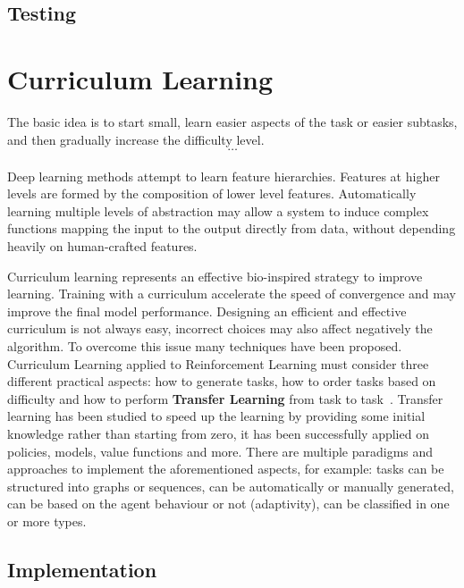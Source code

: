 \documentclass[11pt, a4paper, hidelinks]{report}
\begin{document}
\subsection{Testing}\label{subsec:testing2}

\section{Curriculum Learning}\label{sec:curriculum-learning}

\begin{quoting}[font=itshape, begintext={"}, endtext={"\citep{bengio_curiculum}}]
The basic idea is to start small, learn easier aspects of the task or easier subtasks, and then gradually increase the difficulty level.\\
\[\dots\]\\
Deep learning methods attempt to learn feature hierarchies.
Features at higher levels are formed by the composition of lower level features.
Automatically learning multiple levels of abstraction may allow a system to induce complex functions mapping the input to the output directly from data, without depending heavily on human-crafted features.
\end{quoting}

Curriculum learning represents an effective bio-inspired strategy to improve learning.
Training with a curriculum accelerate the speed of convergence and may improve the final model performance.
Designing an efficient and effective curriculum is not always easy, incorrect choices may also affect negatively the algorithm.
To overcome this issue many techniques have been proposed.
Curriculum Learning applied to Reinforcement Learning must consider three different practical aspects: how to generate tasks, how to order tasks based on difficulty and how to perform \textbf{Transfer Learning} from task to task~\citep{narvekar2020curriculum}.
Transfer learning has been studied to speed up the learning by providing some initial knowledge rather than starting from zero, it has been successfully applied on policies, models, value functions and more.
There are multiple paradigms and approaches to implement the aforementioned aspects, for example: tasks can be structured into graphs or sequences, can be automatically or manually generated, can be based on the agent behaviour or not (adaptivity), can be classified in one or more types.

\subsection{Implementation}\label{subsec:implementation3}
\end{document}
